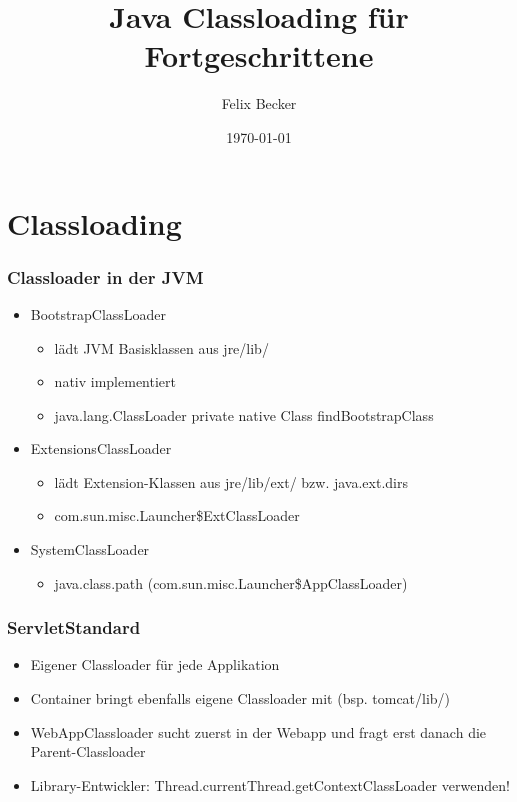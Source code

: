 \documentclass{beamer}
\title{Java Classloading für Fortgeschrittene}
\author{Felix Becker}
\date{\today}
\begin{document}
\maketitle
\frame{\tableofcontents}
 
\section{Classloading}
	\begin{frame}
		\frametitle{Classloader in der JVM}
		\begin{itemize}
			\item{BootstrapClassLoader}

			\begin{itemize}
				\item{lädt JVM Basisklassen aus jre/lib/}
				\item{nativ implementiert}
				\item{java.lang.ClassLoader private native Class findBootstrapClass}
			\end{itemize}

			\pause

			\item{ExtensionsClassLoader}
			\begin{itemize}
				\item{lädt Extension-Klassen aus jre/lib/ext/ bzw. java.ext.dirs}
				\item{com.sun.misc.Launcher\$ExtClassLoader}
			\end{itemize}

			\pause

			\item{SystemClassLoader}
			\begin{itemize}
				\item{java.class.path (com.sun.misc.Launcher\$AppClassLoader)}
			\end{itemize}
		\end{itemize}
	\end{frame}

	\begin{frame}
		\frametitle{ServletStandard}
		\begin{itemize}
			\item{Eigener Classloader für jede Applikation}
			\item{Container bringt ebenfalls eigene Classloader mit (bsp. tomcat/lib/)}
			\item{WebAppClassloader sucht zuerst in der Webapp und fragt erst danach die Parent-Classloader}
			\item{Library-Entwickler: Thread.currentThread.getContextClassLoader verwenden!}
		\end{itemize}
	\end{frame}
\end{document}
